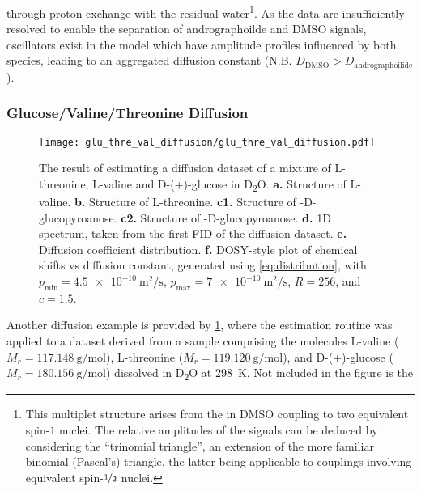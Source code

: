 through proton exchange with the residual water\footnote{
    This multiplet structure arises from the  in \acs{DMSO} coupling to
    two
    equivalent spin-$1$  nuclei. The relative amplitudes of the signals
    can be deduced by considering the ``trinomial triangle'', an extension of
    the more familiar binomial (Pascal's) triangle, the latter being applicable
    to couplings involving equivalent spin-$\nicefrac{1}{2}$ nuclei.
}. As the
data are insufficiently resolved to enable the separation of andrographoilde and
\acs{DMSO} signals, oscillators exist in the model which have amplitude profiles
influenced by both species, leading to an aggregated diffusion constant (N.B.
$D_{\text{DMSO}} > D_{\text{andrographoilide}}$).

\subsubsection{Glucose/Valine/Threonine Diffusion}
\begin{figure}
    \centering
    \texttt{[image: glu\_thre\_val\_diffusion/glu\_thre\_val\_diffusion.pdf]}
    \caption[
        The result of estimating a diffusion dataset of a mixture of L-threonine,
        L-valine and D-(+)-glucose.
    ]{
        The result of estimating a diffusion dataset of a mixture of L-threonine,
        L-valine and D-(+)-glucose in D\textsubscript{2}O.
        \textbf{a.} Structure of L-valine.
        \textbf{b.} Structure of L-threonine.
        \textbf{c1.} Structure of \textalpha-D-glucopyroanose.
        \textbf{c2.} Structure of \textbeta-D-glucopyroanose.
        \textbf{d.} \acs{1D} spectrum, taken from the first \acs{FID} of the
        diffusion dataset.
        \textbf{e.} Diffusion coefficient distribution.
        \textbf{f.} \acs{DOSY}-style plot of chemical shifts vs diffusion
        constant, generated using \cref{eq:distribution}, with
        $p_{\text{min}} = \qty{4.5e-10}{\meter\squared\per\second}$,
        $p_{\text{max}} = \qty{7e-10}{\meter\squared\per\second}$,
        $R=256$, and $c=1.5$.
    }
    \label{fig:gluc_val_thre}
\end{figure}
Another diffusion example is provided by \cref{fig:gluc_val_thre}, where the
estimation routine was applied to a dataset derived from a sample comprising
the molecules L-valine ($M_r = \qty{117.148}{\gram\per\mole}$),
L-threonine ($M_r = \qty{119.120}{\gram\per\mole}$), and D-(+)-glucose ($M_r =
\qty{180.156}{\gram\per\mole}$) dissolved in
D\textsubscript{2}O at \qty{298}{\kelvin}. Not included in the figure is the
